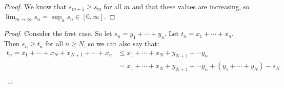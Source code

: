 \documentclass{report}
\begin{document}
\begin{proof}
    We know that $s_{m+1} \geq s_m$ for all $m$ and that these values are increasing, so $\lim_{m \to \infty} s_n = \sup_{n}s_n \in [0, \infty]$. 
\end{proof}
\begin{proof}
    Consider the first case. So let $s_n = y_1 + \cdots + y_n$. Let $t_n = x_1 + \cdots + x_n$. Then $s_n \geq t_n$ for all $n \geq N$, so we can also say that:
    \begin{align*}
        t_n = x_1 + \cdots + x_N + x_{N+1} + \cdots + x_n &\leq x_1 + \cdots + x_N + y_{N+1} + \cdots y_n \\
        &=x_1 + \cdots + x_N + y_{N+1} + \cdots y_n  + (y_1 + \cdots + y_N) - s_N\\
    \end{align*}
\end{proof}
\end{document}
